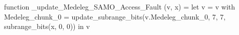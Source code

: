 function _update_Medeleg_SAMO_Access_Fault (v, x) = let v = { v with Medeleg_chunk_0 = update_subrange_bits(v.Medeleg_chunk_0, 7, 7, subrange_bits(x, 0, 0)) } in
  v
